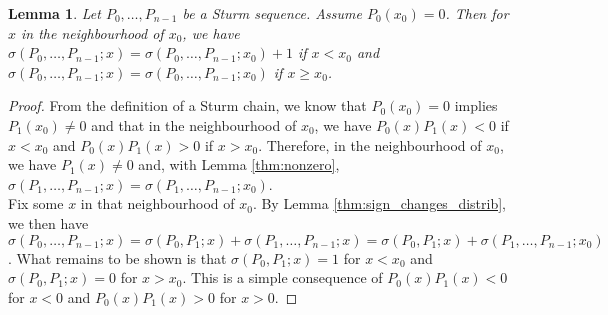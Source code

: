 \documentclass[11pt,a4paper,oneside]{article}
\newtheorem{lemma}[definition]{Lemma}
\begin{document}
\label{thm:zero}
\begin{lemma}
Let $P_0,\ldots,P_{n-1}$ be a Sturm sequence. Assume $P_0(x_0)=0$. Then for $x$ in the neighbourhood of $x_0$, we have $\sigma(P_0,\ldots,P_{n-1};x)=\sigma(P_0,\ldots,P_{n-1};x_0)+1$ if $x<x_0$ and $\sigma(P_0,\ldots,P_{n-1};x)=\sigma(P_0,\ldots,P_{n-1};x_0)$ if $x\geq x_0$.\\
\end{lemma}
\begin{proof}
From the definition of a Sturm chain, we know that $P_0(x_0)=0$ implies $P_1(x_0)\neq 0$ and that in the neighbourhood of $x_0$, we have $P_0(x)P_1(x)<0$ if $x<x_0$ and $P_0(x)P_1(x)>0$ if $x>x_0$. Therefore, in the neighbourhood of $x_0$, we have $P_1(x)\neq 0$ and, with Lemma \ref{thm:nonzero}, $\sigma(P_1,\ldots,P_{n-1};x) = \sigma(P_1,\ldots,P_{n-1};x_0)$.\\
Fix some $x$ in that neighbourhood of $x_0$. By Lemma \ref{thm:sign_changes_distrib}, we then have $\sigma(P_0,\ldots,P_{n-1};x)=\sigma(P_0,P_1;x)+\sigma(P_1,\ldots,P_{n-1};x)=\sigma(P_0,P_1;x)+\sigma(P_1,\ldots,P_{n-1};x_0)$. What remains to be shown is that $\sigma(P_0,P_1;x)=1$ for $x<x_0$ and $\sigma(P_0,P_1;x)=0$ for $x>x_0$. This is a simple consequence of $P_0(x)P_1(x)<0$ for $x<0$ and $P_0(x)P_1(x)>0$ for $x>0$.
\end{proof}
\end{document}
